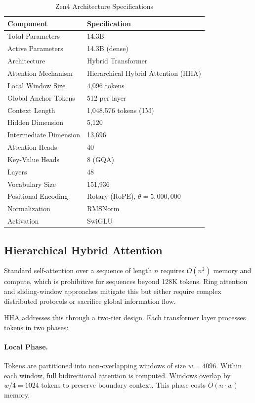\documentclass[11pt,a4paper]{article}
\begin{document}
\begin{table}[H]
\centering
\begin{tabular}{ll}
\toprule
\textbf{Component} & \textbf{Specification} \\
\midrule
Total Parameters       & 14.3B \\
Active Parameters      & 14.3B (dense) \\
Architecture           & Hybrid Transformer \\
Attention Mechanism    & Hierarchical Hybrid Attention (HHA) \\
Local Window Size      & 4,096 tokens \\
Global Anchor Tokens   & 512 per layer \\
Context Length         & 1,048,576 tokens (1M) \\
Hidden Dimension       & 5,120 \\
Intermediate Dimension & 13,696 \\
Attention Heads        & 40 \\
Key-Value Heads        & 8 (GQA) \\
Layers                 & 48 \\
Vocabulary Size        & 151,936 \\
Positional Encoding    & Rotary (RoPE), $\theta = 5{,}000{,}000$ \\
Normalization          & RMSNorm \\
Activation             & SwiGLU \\
\bottomrule
\end{tabular}
\caption{Zen4 Architecture Specifications}
\end{table}

\subsection{Hierarchical Hybrid Attention}

Standard self-attention over a sequence of length $n$ requires $O(n^2)$ memory and compute, which
is prohibitive for sequences beyond 128K tokens. Ring attention and sliding-window approaches
mitigate this but either require complex distributed protocols or sacrifice global information flow.

HHA addresses this through a two-tier design. Each transformer layer processes tokens in two phases:

\paragraph{Local Phase.} Tokens are partitioned into non-overlapping windows of size $w = 4096$.
Within each window, full bidirectional attention is computed. Windows overlap by $w/4 = 1024$ tokens
to preserve boundary context. This phase costs $O(n \cdot w)$ memory.
\end{document}
